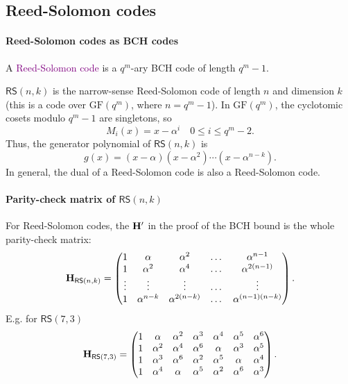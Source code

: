 \documentclass[a4paper, 11pt, openany]{book}
\numberwithin{equation}{section}
\theoremstyle{plain}
\theoremstyle{definition}
\newcommand{\GF}{\mathrm{GF}}
\newcommand{\Define}[1]{\textcolor{purple}{#1}}
\newcommand{\code}[1]{\mathsf{#1}}
\newcommand{\ReedSolomon}           {\code{RS}}
\begin{document}
\subsection{Reed-Solomon codes}

\paragraph{Reed-Solomon codes as BCH codes}

A \Define{Reed-Solomon code} is a $q^m$-ary BCH code of length $q^m - 1$.

$\ReedSolomon(n,k)$ is the narrow-sense Reed-Solomon code of length $n$ and dimension $k$ (this is a code over $\GF(q^m)$, where $n = q^m-1$). In $\GF(q^m)$, the cyclotomic cosets modulo $q^m - 1$ are singletons, so 
\[
    M_i(x) = x - \alpha^i \quad 0 \le i \le q^m - 2.
\]
Thus, the generator polynomial of $\ReedSolomon(n,k)$ is
\[
	g(x) = (x - \alpha) (x - \alpha^2) \cdots (x - \alpha^{n-k}).
\]
In general, the dual of a Reed-Solomon code is also a Reed-Solomon code.


\paragraph{Parity-check matrix of $\ReedSolomon(n,k)$}
For Reed-Solomon codes, the ${\bf H}'$ in the proof of the BCH bound is the whole parity-check matrix:
\[
	{\bf H}_{\ReedSolomon(n,k)} = \begin{pmatrix}
	1 & \alpha & \alpha^2 & \dots & \alpha^{n-1}\\
	1 & \alpha^2 & \alpha^4 & \dots & \alpha^{2(n-1)}\\
	\vdots & \vdots & \vdots & \dots & \vdots\\
	1 & \alpha^{n-k} & \alpha^{2(n-k)} & \dots & \alpha^{(n-1)(n-k)}
	\end{pmatrix}.
\]
E.g. for $\ReedSolomon(7,3)$
$$
	{\bf H}_{\ReedSolomon(7,3)} = \begin{pmatrix}
	1 & \alpha   & \alpha^2 & \alpha^3 & \alpha^4 & \alpha^5 & \alpha^6\\
	1 & \alpha^2 & \alpha^4 & \alpha^6 & \alpha   & \alpha^3 & \alpha^5\\
	1 & \alpha^3 & \alpha^6 & \alpha^2 & \alpha^5 & \alpha   & \alpha^4\\
	1 & \alpha^4 & \alpha   & \alpha^5 & \alpha^2 & \alpha^6 & \alpha^3
	\end{pmatrix}.
$$
\end{document}
